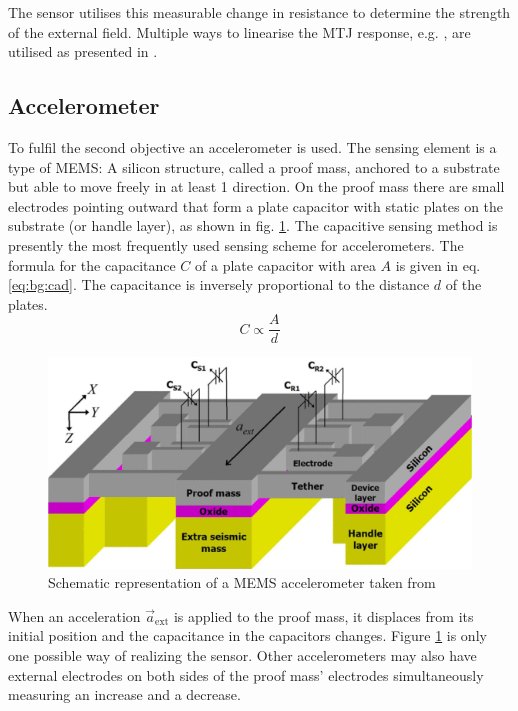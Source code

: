 The sensor utilises this measurable change in resistance to determine the strength of the external field. Multiple ways to linearise the \ac{MTJ} response, e.g. , are utilised as presented in \parencite{yan2022}.

\subsection{Accelerometer \label{sec:bg:accelerometers}}
To fulfil the second objective an accelerometer is used. The sensing element is a type of \ac{MEMS}: A silicon structure, called a proof mass, anchored to a substrate but able to move freely in at least 1 direction. On the proof mass there are small electrodes pointing outward that form a plate capacitor with static plates on the substrate (or handle layer), as shown in fig. \ref{fig:bg:mems_accelerometer}. The capacitive sensing method is presently the most frequently used sensing scheme for accelerometers. The formula for the capacitance $C$ of a plate capacitor with area $A$ is given in eq. \eqref{eq:bg:cad}. The capacitance is inversely proportional to the distance $d$ of the plates.
\begin{equation}
    C\propto\frac{A}{d}
    \label{eq:bg:cad}
\end{equation}

\begin{figure}[H]
    \centering
    \includegraphics[width=0.6\linewidth]{images/01_background/mems_acc_diagram.png}
    \caption{Schematic representation of a \ac{MEMS} accelerometer taken from \parencite{abdolvand2007}}
    \label{fig:bg:mems_accelerometer}
\end{figure}

When an acceleration $\vec{a}_{\mathrm{ext}}$ is applied to the proof mass, it displaces from its initial position and the capacitance in the capacitors changes. Figure \ref{fig:bg:mems_accelerometer} is only one possible way of realizing the sensor. Other accelerometers may also have external electrodes on both sides of the proof mass' electrodes simultaneously measuring an increase and a decrease. 


